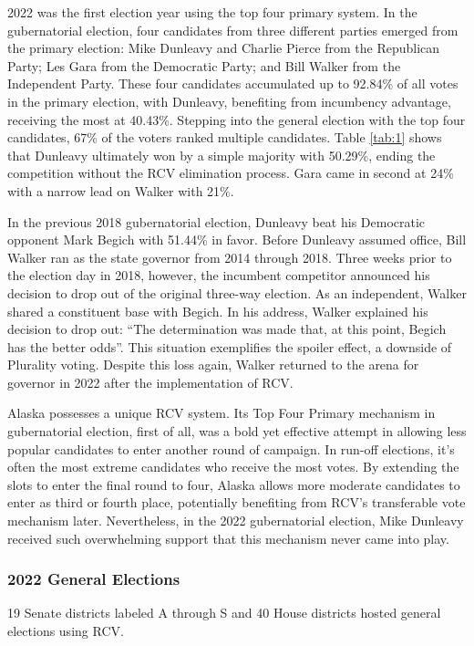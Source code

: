 \documentclass[12pt, a4paper, twoside]{article}
\begin{document}
2022 was the first election year using the top four primary system. In the gubernatorial election, four candidates from three different parties emerged from the primary election: Mike Dunleavy and Charlie Pierce from the Republican Party; Les Gara from the Democratic Party; and Bill Walker from the Independent Party. These four candidates accumulated up to 92.84\% of all votes in the primary election, with Dunleavy, benefiting from incumbency advantage, receiving the most at 40.43\%. Stepping into the general election with the top four candidates, 67\% of the voters ranked multiple candidates. Table \ref{tab:1} shows that Dunleavy ultimately won by a simple majority with 50.29\%, ending the competition without the RCV elimination process. Gara came in second at 24\% with a narrow lead on Walker with 21\%.

In the previous 2018 gubernatorial election, Dunleavy beat his Democratic opponent Mark Begich with 51.44\% in favor. Before Dunleavy assumed office, Bill Walker ran as the state governor from 2014 through 2018. Three weeks prior to the election day in 2018, however, the incumbent competitor announced his decision to drop out of the original three-way election. As an independent, Walker shared a constituent base with Begich. In his address, Walker explained his decision to drop out: “The determination was made that, at this point, Begich has the better odds”. This situation exemplifies the spoiler effect, a downside of Plurality voting. Despite this loss again, Walker returned to the arena for governor in 2022 after the implementation of RCV. 

Alaska possesses a unique RCV system. Its Top Four Primary mechanism in gubernatorial election, first of all, was a bold yet effective attempt in allowing less popular candidates to enter another round of campaign. In run-off elections, it’s often the most extreme candidates who receive the most votes. By extending the slots to enter the final round to four, Alaska allows more moderate candidates to enter as third or fourth place, potentially benefiting from RCV’s transferable vote mechanism later. Nevertheless, in the 2022 gubernatorial election, Mike Dunleavy received such overwhelming support that this mechanism never came into play. 

\subsubsection{2022 General Elections}

19 Senate districts labeled A through S and 40 House districts hosted general elections using RCV. 
\end{document}
